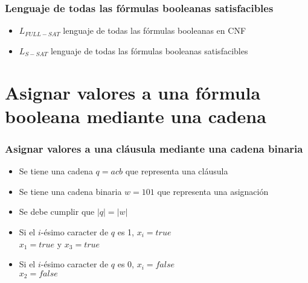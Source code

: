 \documentclass{beamer}
\begin{document}
\begin{frame}
    \frametitle{Lenguaje de todas las fórmulas booleanas satisfacibles}
    
    \begin{itemize}
        \item $L_{FULL-SAT}$ lenguaje de todas las fórmulas booleanas en CNF
              \pause
        \item  $L_{S-SAT}$ lenguaje de todas las fórmulas booleanas satisfacibles
    \end{itemize}
\end{frame}

\section{Asignar valores a una fórmula booleana mediante una cadena}

\begin{frame}
    \frametitle{Asignar valores a una cláusula mediante una cadena binaria}
    
    \begin{itemize}
        \item Se tiene una cadena $q=acb$ que representa una cláusula
              \pause
        \item Se tiene una cadena binaria $w=101$ que representa una asignación
              \pause
        \item Se debe cumplir que $|q|=|w|$
              \pause
        \item Si el $i$-ésimo caracter de $q$ es 1, $x_i=true$\\
              $x_1=true$ y $x_3=true$
              \pause
        \item Si el $i$-ésimo caracter de $q$ es 0, $x_i=false$\\
              $x_2=false$
    \end{itemize}
    
\end{frame}
\end{document}
